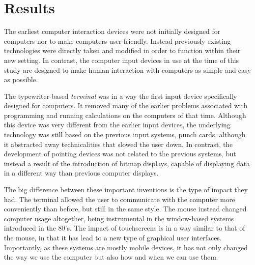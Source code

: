 

\section{Results}


The earliest computer interaction devices were not initially designed for computers nor to make computers user-friendly. Instead previously existing technologies were directly taken and modified in order to function within their new setting. In contrast, the computer input devices in use at the time of this study are designed to make human interaction with computers as simple and easy as possible.

The typewriter-based \emph{terminal} was in a way the first input device specifically designed for computers. It removed many of the earlier problems associated with programming and running calculations on the computers of that time. Although this device was very different from the earlier input devices, the underlying technology was still based on the previous input systems, punch cards, although it abstracted away technicalities that slowed the user down. In contrast, the development of pointing devices was not related to the previous systems, but instead a result of the introduction of bitmap displays, capable of displaying data in a different way than previous computer displays.

The big difference between these important inventions is the type of impact they had. The terminal allowed the user to communicate with the computer more conveniently than before, but still in the same style. The mouse instead changed computer usage altogether, being instrumental in the window-based systems introduced in the 80's. The impact of touchscreens is in a way similar to that of the mouse, in that it has lead to a new type of graphical user interfaces. Importantly, as these systems are mostly mobile devices, it has not only changed the way we use the computer but also how and when we can use them.



